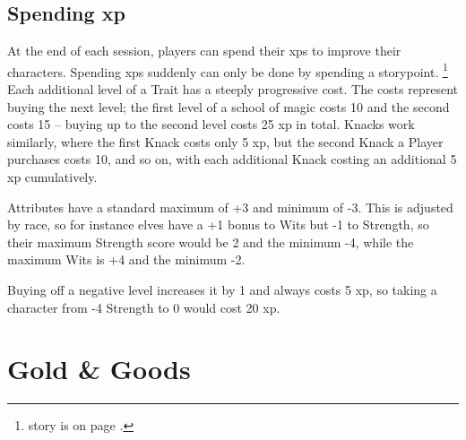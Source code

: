 \begin{multicols}{2}
\subsection{Spending \gls{xp}}

At the end of each session, players can spend their \glspl{xp} to improve their characters.
Spending \glspl{xp} suddenly can only be done by spending a \gls{storypoint}.%
\footnote{ story is on page \pageref{surpriseSkill}.}
Each additional level of a Trait has a steeply progressive cost.
The costs represent buying the next level; the first level of a school of magic costs 10 and the second costs 15 -- buying up to the second level costs 25 \gls{xp} in total.
Knacks work similarly, where the first Knack costs only 5 \gls{xp}, but the second Knack a Player purchases costs 10, and so on, with each additional Knack costing an additional 5 \gls{xp} cumulatively.

Attributes have a standard maximum of +3 and minimum of -3. This is adjusted by race, so for instance elves have a +1 bonus to Wits but -1 to Strength, so their maximum Strength score would be 2 and the minimum -4, while the maximum Wits is +4 and the minimum -2.

Buying off a negative level increases it by 1 and always costs 5 \gls{xp}, so taking a character from -4 Strength to 0 would cost 20 \gls{xp}.

\end{multicols}

\section{Gold \& Goods}
\label{goods}

